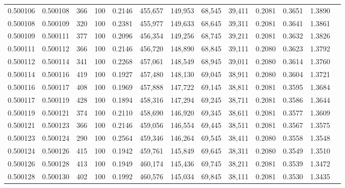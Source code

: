 \begin{tabular}{rrrrrrrrrrrrr}
0.500106 & 0.500108 &   366 & 100 &                                     0.2146 & 455,657 & 149,953 &  68,545 &  39,411 & 0.2081 & 0.3651 & 1.3890 \\
0.500108 & 0.500109 &   320 & 100 &                                     0.2381 & 455,977 & 149,633 &  68,645 &  39,311 & 0.2081 & 0.3641 & 1.3861 \\
0.500109 & 0.500111 &   377 & 100 &                                     0.2096 & 456,354 & 149,256 &  68,745 &  39,211 & 0.2081 & 0.3632 & 1.3826 \\
0.500111 & 0.500112 &   366 & 100 &                                     0.2146 & 456,720 & 148,890 &  68,845 &  39,111 & 0.2080 & 0.3623 & 1.3792 \\
0.500112 & 0.500114 &   341 & 100 &                                     0.2268 & 457,061 & 148,549 &  68,945 &  39,011 & 0.2080 & 0.3614 & 1.3760 \\
0.500114 & 0.500116 &   419 & 100 &                                     0.1927 & 457,480 & 148,130 &  69,045 &  38,911 & 0.2080 & 0.3604 & 1.3721 \\
0.500116 & 0.500117 &   408 & 100 &                                     0.1969 & 457,888 & 147,722 &  69,145 &  38,811 & 0.2081 & 0.3595 & 1.3684 \\
0.500117 & 0.500119 &   428 & 100 &                                     0.1894 & 458,316 & 147,294 &  69,245 &  38,711 & 0.2081 & 0.3586 & 1.3644 \\
0.500119 & 0.500121 &   374 & 100 &                                     0.2110 & 458,690 & 146,920 &  69,345 &  38,611 & 0.2081 & 0.3577 & 1.3609 \\
0.500121 & 0.500123 &   366 & 100 &                                     0.2146 & 459,056 & 146,554 &  69,445 &  38,511 & 0.2081 & 0.3567 & 1.3575 \\
0.500123 & 0.500124 &   290 & 100 &                                     0.2564 & 459,346 & 146,264 &  69,545 &  38,411 & 0.2080 & 0.3558 & 1.3548 \\
0.500124 & 0.500126 &   415 & 100 &                                     0.1942 & 459,761 & 145,849 &  69,645 &  38,311 & 0.2080 & 0.3549 & 1.3510 \\
0.500126 & 0.500128 &   413 & 100 &                                     0.1949 & 460,174 & 145,436 &  69,745 &  38,211 & 0.2081 & 0.3539 & 1.3472 \\
0.500128 & 0.500130 &   402 & 100 &                                     0.1992 & 460,576 & 145,034 &  69,845 &  38,111 & 0.2081 & 0.3530 & 1.3435 \\

\end{tabular}
